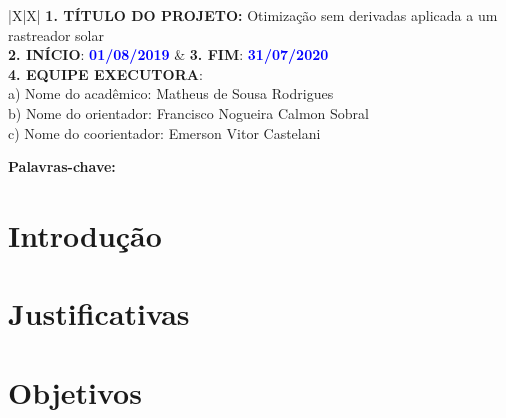 \documentclass[portuguese, a4paper, 12pt, draft]{article}
\begin{document}
\begin{center}
  \begin{tabularx}{\textwidth}{|X|X|}
    \hline
    {\textbf{1. TÍTULO DO PROJETO:} Otimização sem derivadas aplicada a um rastreador solar} \\ \hline
    \textbf{2. INÍCIO}: \textcolor{blue}{\bf 01/08/2019} &
    \textbf{3. FIM}: \textcolor{blue}{\bf 31/07/2020} \\ \hline
    {\textbf{4. EQUIPE EXECUTORA}:} \\ \hline
     {a) Nome do acadêmico: Matheus de Sousa Rodrigues} \\ \hline
    {b) Nome do orientador: Francisco Nogueira Calmon Sobral} \\
    \hline
    {c) Nome do coorientador: Emerson Vitor Castelani} \\ \hline
  \end{tabularx}
\end{center}

\setcounter{section}{4}


\noindent
\textbf{Palavras-chave:} 

\section{Introdução}


\section{Justificativas}

\section{Objetivos}
\end{document}
